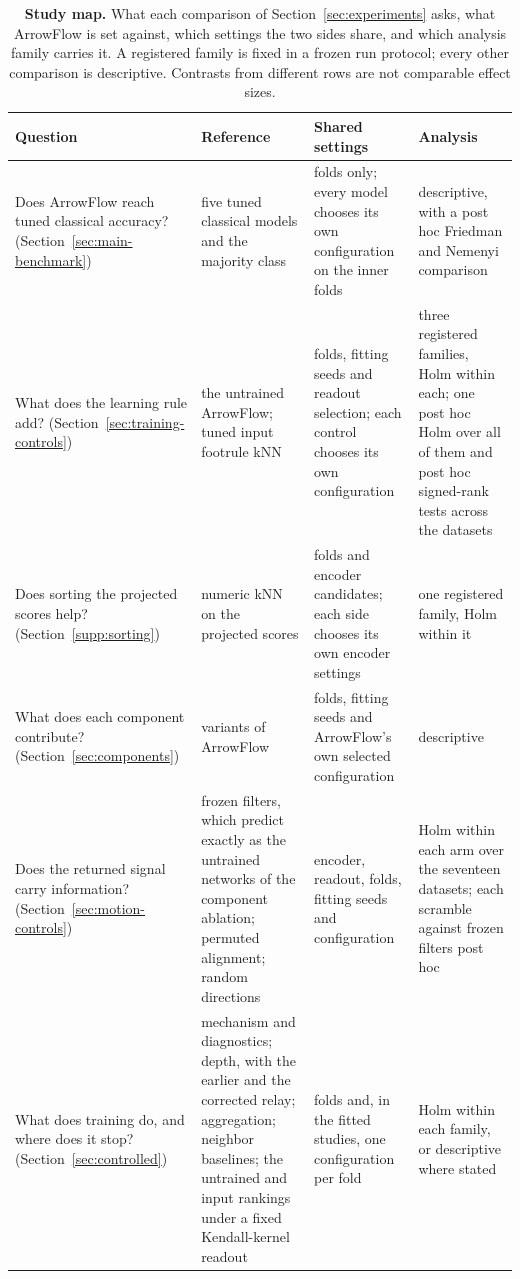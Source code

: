 \begin{table}[!htbp]
\caption{\textbf{Study map.} What each comparison of Section~\ref{sec:experiments} asks, what ArrowFlow is set against, which settings the two sides share, and which analysis family carries it. A registered family is fixed in a frozen run protocol; every other comparison is descriptive. Contrasts from different rows are not comparable effect sizes.}
\label{tab:study-map}
\centering
\scriptsize
\begin{tabular}{@{}p{} p{} p{} p{}@{}}
\toprule
Question & Reference & Shared settings & Analysis \\
\midrule
Does ArrowFlow reach tuned classical accuracy? (Section~\ref{sec:main-benchmark}) &
five tuned classical models and the majority class &
folds only; every model chooses its own configuration on the inner folds &
descriptive, with a post hoc Friedman and Nemenyi comparison \\
\addlinespace
What does the learning rule add? (Section~\ref{sec:training-controls}) &
the untrained ArrowFlow; tuned input footrule kNN &
folds, fitting seeds and readout selection; each control chooses its own configuration &
three registered families, Holm within each; one post hoc Holm over all of them and post hoc signed-rank tests across the datasets \\
\addlinespace
Does sorting the projected scores help? (Section~\ref{supp:sorting}) &
numeric kNN on the projected scores &
folds and encoder candidates; each side chooses its own encoder settings &
one registered family, Holm within it \\
\addlinespace
What does each component contribute? (Section~\ref{sec:components}) &
variants of ArrowFlow &
folds, fitting seeds and ArrowFlow's own selected configuration &
descriptive \\
\addlinespace
Does the returned signal carry information? (Section~\ref{sec:motion-controls}) &
frozen filters, which predict exactly as the untrained networks of the component ablation; permuted alignment; random directions &
encoder, readout, folds, fitting seeds and configuration &
Holm within each arm over the seventeen datasets; each scramble against frozen filters post hoc \\
\addlinespace
What does training do, and where does it stop? (Section~\ref{sec:controlled}) &
mechanism and diagnostics; depth, with the earlier and the corrected relay; aggregation; neighbor baselines; the untrained and input rankings under a fixed Kendall-kernel readout &
folds and, in the fitted studies, one configuration per fold &
Holm within each family, or descriptive where stated \\
\bottomrule
\end{tabular}
\end{table}
